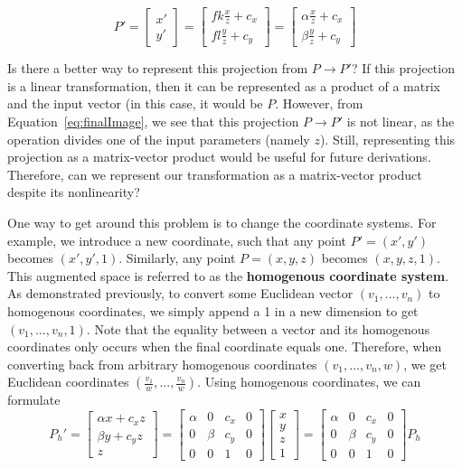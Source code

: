 \documentclass[a4paper, 12pt]{article}
\renewcommand\emph{\textbf}
\begin{document}
\begin{equation}
    P' = \begin{bmatrix}x'\\y'\end{bmatrix} = \begin{bmatrix}fk\frac{x}{z}+c_x \\ fl\frac{y}{z}+c_y\end{bmatrix} = \begin{bmatrix}\alpha\frac{x}{z}+c_x \\ \beta\frac{y}{z}+c_y\end{bmatrix}
    \label{eq:finalImage}
\end{equation}

Is there a better way to represent this projection from $P\rightarrow P'$? If this projection is a linear transformation, then it can be represented as a product of a matrix and the input vector (in this case, it would be $P$. However, from Equation~\ref{eq:finalImage}, we see that this projection $P\rightarrow P'$ is not linear, as the operation divides one of the input parameters (namely $z$). Still, representing this projection as a matrix-vector product would be useful for future derivations. Therefore, can we represent our transformation as a matrix-vector product despite its nonlinearity?

One way to get around this problem is to change the coordinate systems. For example, we introduce a new coordinate, such that any point $P' =(x',y')$ becomes $(x',y',1)$. Similarly, any point $P =(x,y,z)$ becomes $(x,y,z,1)$. This augmented space is referred to as the \emph{homogenous coordinate system}. As demonstrated previously, to convert some Euclidean vector $(v_1,...,v_n)$ to homogenous coordinates, we simply append a 1 in a new dimension to get $(v_1,...,v_n,1)$. Note that the equality between a vector and its homogenous coordinates only occurs when the final coordinate equals one. Therefore, when converting back from arbitrary homogenous coordinates $(v_1,  ... , v_n , w)$, we get Euclidean coordinates $(\frac{v_1}{w},...,\frac{v_n}{w})$. Using homogenous coordinates, we can formulate
\begin{equation}
    P_h' = \begin{bmatrix}\alpha x + c_xz\\\beta y + c_yz \\ z\end{bmatrix} = 
    \begin{bmatrix}
    \alpha & 0 & c_x & 0\\
    0 & \beta & c_y & 0 \\ 
    0 & 0 & 1 & 0
    \end{bmatrix}
    \begin{bmatrix}x\\y\\z\\1\end{bmatrix} =     \begin{bmatrix}
    \alpha & 0 & c_x & 0\\
    0 & \beta & c_y & 0 \\ 
    0 & 0 & 1 & 0
    \end{bmatrix} P_h
    \label{eq:homogenous}
\end{equation}
\end{document}
